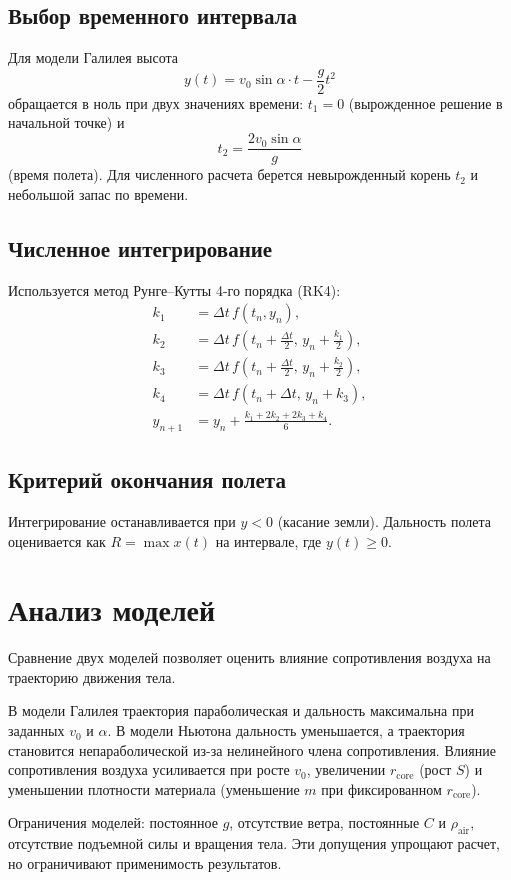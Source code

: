 \documentclass[a4paper, 14pt]{extarticle}
\begin{document}
\subsection{Выбор временного интервала}
Для модели Галилея высота
\[
y(t)=v_0\sin\alpha\cdot t-\frac{g}{2}t^2
\]
обращается в ноль при двух значениях времени: $t_1=0$ (вырожденное решение в начальной точке) и
\[
t_2=\frac{2v_0\sin\alpha}{g}
\]
(время полета). Для численного расчета берется невырожденный корень $t_2$ и небольшой запас по времени.

\subsection{Численное интегрирование}
Используется метод Рунге--Кутты 4-го порядка (RK4):
\[
\begin{aligned}
k_1 &= \Delta t\, f(t_n, y_n),\\
k_2 &= \Delta t\, f\!\left(t_n+\frac{\Delta t}{2},\, y_n+\frac{k_1}{2}\right),\\
k_3 &= \Delta t\, f\!\left(t_n+\frac{\Delta t}{2},\, y_n+\frac{k_2}{2}\right),\\
k_4 &= \Delta t\, f(t_n+\Delta t,\, y_n+k_3),\\
y_{n+1} &= y_n+\frac{k_1+2k_2+2k_3+k_4}{6}.
\end{aligned}
\]

\subsection{Критерий окончания полета}
Интегрирование останавливается при $y<0$ (касание земли). Дальность полета оценивается как $R=\max x(t)$ на интервале, где $y(t)\ge 0$.

\section{Анализ моделей}
Сравнение двух моделей позволяет оценить влияние сопротивления воздуха на траекторию движения тела.

В модели Галилея траектория параболическая и дальность максимальна при заданных $v_0$ и $\alpha$. В модели Ньютона дальность уменьшается, а траектория становится непараболической из-за нелинейного члена сопротивления. Влияние сопротивления воздуха усиливается при росте $v_0$, увеличении $r_{\text{core}}$ (рост $S$) и уменьшении плотности материала (уменьшение $m$ при фиксированном $r_{\text{core}}$).

Ограничения моделей: постоянное $g$, отсутствие ветра, постоянные $C$ и $\rho_{\text{air}}$, отсутствие подъемной силы и вращения тела. Эти допущения упрощают расчет, но ограничивают применимость результатов.
\end{document}
